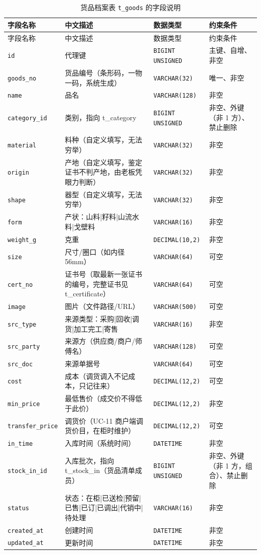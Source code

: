 \documentclass[12pt, a4paper]{ctexart}
\newcommand{\code}[1]{\texttt{\small #1}}
\begin{document}
\begin{longtable}{@{}p{3.1cm} p{4.5cm} p{2.4cm} p{4.5cm}@{}}
\caption{货品档案表 \code{t\_goods} 的字段说明}\label{tab:f-t-goods}\\
\toprule
字段名称 & 中文描述 & 数据类型 & 约束条件 \\
\midrule
\endfirsthead
\toprule
字段名称 & 中文描述 & 数据类型 & 约束条件 \\
\midrule
\endhead
\bottomrule
\endlastfoot
\code{id} & 代理键 & \code{BIGINT UNSIGNED} & 主键、自增、非空 \\
\code{goods\_no} & 货品编号（条形码，一物一码，系统生成） & \code{VARCHAR(32)} & 唯一、非空 \\
\code{name} & 品名 & \code{VARCHAR(128)} & 非空 \\
\code{category\_id} & 类别，指向 t\_category & \code{BIGINT UNSIGNED} & 非空、外键（非 1 方）、禁止删除 \\
\code{material} & 料种（自定义填写，无法穷举） & \code{VARCHAR(32)} & 非空 \\
\code{origin} & 产地（自定义填写，鉴定证书不判产地，由老板凭眼力判断） & \code{VARCHAR(32)} & 非空 \\
\code{shape} & 器型（自定义填写，无法穷举） & \code{VARCHAR(32)} & 非空 \\
\code{form} & 产状：山料|籽料|山流水料|戈壁料 & \code{VARCHAR(16)} & 非空 \\
\code{weight\_g} & 克重 & \code{DECIMAL(10,2)} & 非空 \\
\code{size} & 尺寸/圈口（如内径56mm） & \code{VARCHAR(64)} & 可空 \\
\code{cert\_no} & 证书号（取最新一张证书的编号，完整证书见 t\_certificate） & \code{VARCHAR(64)} & 可空 \\
\code{image} & 图片（文件路径/URL） & \code{VARCHAR(500)} & 可空 \\
\code{src\_type} & 来源类型：采购|回收|调货|加工完工|寄售 & \code{VARCHAR(16)} & 非空 \\
\code{src\_party} & 来源方（供应商/商户/师傅名） & \code{VARCHAR(128)} & 可空 \\
\code{src\_doc} & 来源单据号 & \code{VARCHAR(64)} & 可空 \\
\code{cost} & 成本（调货调入不记成本，只记往来） & \code{DECIMAL(12,2)} & 可空 \\
\code{min\_price} & 最低售价（成交价不得低于此价） & \code{DECIMAL(12,2)} & 非空 \\
\code{transfer\_price} & 调货价（UC-11 商户端调货价目，在柜时维护） & \code{DECIMAL(12,2)} & 可空 \\
\code{in\_time} & 入库时间（系统时间） & \code{DATETIME} & 非空 \\
\code{stock\_in\_id} & 入库批次，指向 t\_stock\_in（货品清单成员） & \code{BIGINT UNSIGNED} & 非空、外键（非 1 方，组合）、禁止删除 \\
\code{status} & 状态：在柜|已送检|预留|已售|已订|已调出|代销中|待处理 & \code{VARCHAR(16)} & 非空 \\
\code{created\_at} & 创建时间 & \code{DATETIME} & 非空 \\
\code{updated\_at} & 更新时间 & \code{DATETIME} & 非空 \\
\end{longtable}
\end{document}
